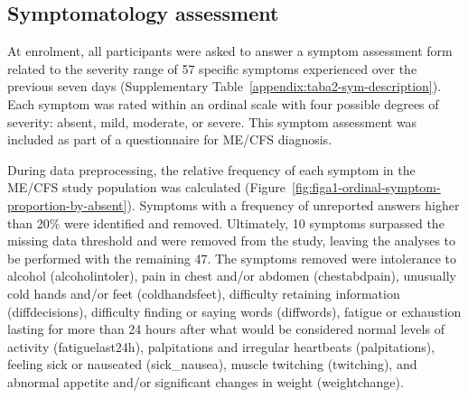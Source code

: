 

\subsection{Symptomatology assessment}

At enrolment, all participants were asked to answer a symptom assessment form related to the severity range of 57 specific symptoms experienced over the previous seven days (Supplementary Table~\ref{appendix:taba2-sym-description}).
Each symptom was rated within an ordinal scale with four possible degrees of severity: absent, mild, moderate, or severe.
This symptom assessment was included as part of a questionnaire for ME/CFS diagnosis.


During data preprocessing, the relative frequency of each symptom in the ME/CFS study population was calculated (Figure~\ref{fig:figa1-ordinal-symptom-proportion-by-absent}).
Symptoms with a frequency of unreported answers higher than 20\% were identified and removed.
Ultimately, 10 symptoms surpassed the missing data threshold and were removed from the study, leaving the analyses to be performed with the remaining 47.
The symptoms removed were intolerance to alcohol (alcoholintoler), pain in chest and/or abdomen (chestabdpain), unusually cold hands and/or feet (coldhandsfeet), difficulty retaining information (diffdecisions), difficulty finding or saying words (diffwords), fatigue or exhaustion lasting for more than 24 hours after what would be considered normal levels of activity (fatiguelast24h), palpitations and irregular heartbeats (palpitations), feeling sick or nauseated (sick\_nausea), muscle twitching (twitching), and abnormal appetite and/or significant changes in weight (weightchange).

